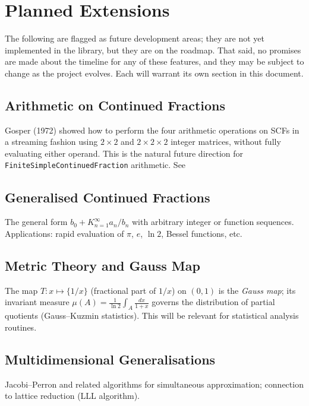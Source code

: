 


\section{Planned Extensions}

The following are flagged as future development areas; they are not yet implemented in the library, 
but they are on the roadmap. That said, no promises are made about the timeline for any of 
these features, and they may be subject to change as the project evolves.
Each will warrant its own section in this document.

\subsection{Arithmetic on Continued Fractions}

Gosper (1972) showed how to perform the four arithmetic operations on SCFs
in a streaming fashion using $2 \times 2$ and $2 \times 2 \times 2$ integer matrices,
without fully evaluating either operand.
This is the natural future direction for \texttt{FiniteSimpleContinuedFraction} arithmetic. See \cite{gosper1972}

\subsection{Generalised Continued Fractions}

The general form $b_0 + K_{n=1}^{\infty} a_n / b_n$ with arbitrary integer or
function sequences.
Applications: rapid evaluation of $\pi$, $e$, $\ln 2$, Bessel functions, etc.

\subsection{Metric Theory and Gauss Map}

The map $T: x \mapsto \{1/x\}$ (fractional part of $1/x$) on $(0,1)$ is the
\emph{Gauss map}; its invariant measure $\mu(A) = \frac{1}{\ln 2}\int_A \frac{dx}{1+x}$
governs the distribution of partial quotients (Gauss--Kuzmin statistics).
This will be relevant for statistical analysis routines.

\subsection{Multidimensional Generalisations}

Jacobi--Perron and related algorithms for simultaneous approximation; connection to
lattice reduction (LLL algorithm).